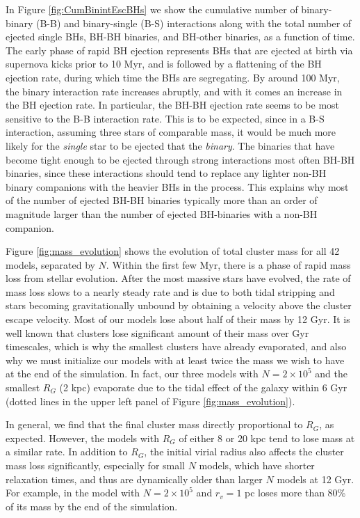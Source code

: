 \documentclass[12pt,preprint]{aastex}
\begin{document}
In Figure \ref{fig:CumBinintEscBHs} we show the cumulative number of binary-binary
(B-B) and binary-single (B-S) interactions along with the total number of ejected single BHs, 
BH-BH binaries, and BH-other binaries, as a function of time. The early phase of rapid 
BH ejection represents BHs that are ejected at birth via supernova kicks prior to 10 Myr, 
and is followed by a flattening of the BH ejection rate, during which time the BHs
are segregating. By around 100 Myr, the binary 
interaction rate increases abruptly, and with it comes an increase in the BH ejection 
rate. In particular, the BH-BH ejection rate seems to be most sensitive to the B-B 
interaction rate. This is to be expected, since in a B-S interaction, assuming three stars of
comparable mass, it would be much more likely for the \emph{single} star to be 
ejected that the \emph{binary}. The binaries that have become tight enough to be 
ejected through strong interactions most often BH-BH binaries, since these interactions 
should tend to replace any lighter non-BH binary companions with the heavier BHs in 
the process. This explains why most of the number of ejected BH-BH binaries typically
more than an order of magnitude larger than the number of ejected BH-binaries with a 
non-BH companion. 


Figure \ref{fig:mass_evolution} 
shows the evolution of total cluster mass for all 42 models, separated by $N$.  Within the first 
few Myr, there is a phase of rapid mass loss from stellar evolution. After the most massive 
stars have evolved, the rate of mass loss slows to a nearly steady rate and is due to both 
tidal stripping and stars becoming gravitationally unbound by obtaining a velocity above
the cluster escape velocity. Most of our models lose about half of their mass by 12 Gyr. 
It is well known that clusters lose significant amount of their mass over Gyr timescales, which
is why the smallest clusters have already evaporated, and also why we must initialize
our models with at least twice the mass we wish to have at the end of the simulation.
In fact, our three models with $N=2 \times 10^5$ and the smallest  $R_G$ (2 kpc)
evaporate due to the tidal effect of the galaxy within 6 Gyr (dotted lines in the upper
left panel of Figure \ref{fig:mass_evolution}). 

In general, we find that the final cluster mass directly proportional to $R_G$, as expected. However, the models
 with $R_G$ of either 8  or 20 kpc tend to lose mass at a similar rate. In addition to $R_G$, 
 the initial virial radius also affects the cluster mass loss significantly, especially for small $N$ models, 
 which have shorter relaxation times, and thus are dynamically older than larger $N$ models at 12 Gyr. 
 For example, in the model with $N=2 \times 10^5$ and $r_v=1$ pc loses more than 80\% of its
  mass by the end of the simulation.  
\end{document}
